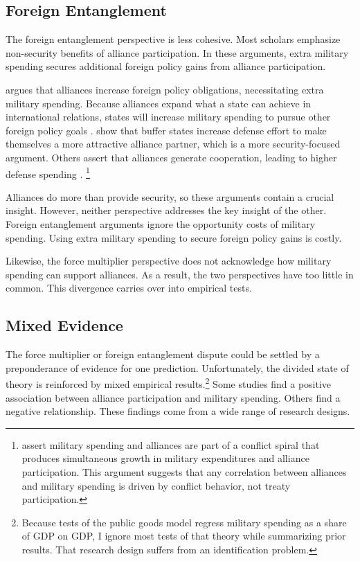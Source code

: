\documentclass[12pt]{article}
\begin{document}
\subsection{Foreign Entanglement}


The foreign entanglement perspective is less cohesive.
Most scholars emphasize non-security benefits of alliance participation. 
In these arguments, extra military spending secures additional foreign policy gains from alliance participation. 


\citet{Diehl1994} argues that alliances increase foreign policy obligations, necessitating extra military spending. 
Because alliances expand what a state can achieve in international relations, states will increase military spending to pursue other foreign policy goals \citep{MorganPalmer2006}. 
\citet{Horowitzetal2017} show that buffer states increase defense effort to make themselves a more attractive alliance partner, which is a more security-focused argument. 
Others assert that alliances generate cooperation, leading to higher defense spending \citep{Palmer1990, QuirozFlores2011}.
\footnote{\citet{SeneseVasquez2008} assert military spending and alliances are part of a conflict spiral that produces simultaneous growth in military expenditures and alliance participation. 
This argument suggests that any correlation between alliances and military spending is driven by conflict behavior, not treaty participation.
}


Alliances do more than provide security, so these arguments contain a crucial insight.
However, neither perspective addresses the key insight of the other. 
Foreign entanglement arguments ignore the opportunity costs of military spending. 
Using extra military spending to secure foreign policy gains is costly.

 
Likewise, the force multiplier perspective does not acknowledge how military spending can support alliances. 
As a result, the two perspectives have too little in common. 
This divergence carries over into empirical tests. 


\subsection{Mixed Evidence} 


The force multiplier or foreign entanglement dispute could be settled by a preponderance of evidence for one prediction. 
Unfortunately, the divided state of theory is reinforced by mixed empirical results.\footnote{Because tests of the public goods model regress military spending as a share of GDP on GDP, I ignore most tests of that theory while summarizing prior results. That research design suffers from an identification problem.}
Some studies find a positive association between alliance participation and military spending. 
Others find a negative relationship. 
These findings come from a wide range of research designs. 
\end{document}

